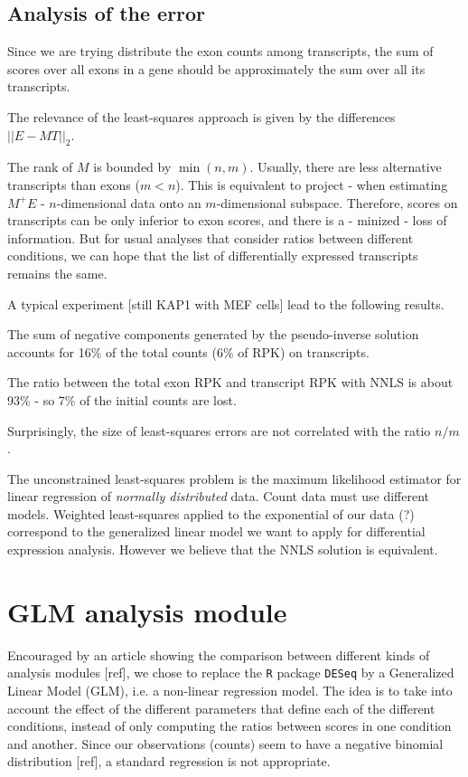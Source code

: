 \documentclass[a4paper,11pt]{article}
\begin{document}
\subsection{Analysis of the error}

Since we are trying distribute the exon counts among transcripts, the sum of scores over all exons in a gene should be approximately the sum over all its transcripts. 

The relevance of the least-squares approach is given by the differences $||E-MT||_2$.
 
The rank of $M$ is bounded by $\min(n,m)$. Usually, there are less alternative transcripts than exons ($m<n$). This is equivalent to project - when estimating $M^{+}E$ - $n$-dimensional data onto an $m$-dimensional subspace. Therefore, scores on transcripts can be only inferior to exon scores, and there is a - minized - loss of information. But for usual analyses that consider ratios between different conditions, we can hope that the list of differentially expressed transcripts remains the same. 

A typical experiment [still KAP1 with MEF cells] lead to the following results.

The sum of negative components generated by the pseudo-inverse solution accounts for 16\% of the total counts (6\% of RPK) on transcripts.

The ratio between the total exon RPK and transcript RPK with NNLS is about 93\% - so 7\% of the initial counts are lost.

Surprisingly, the size of least-squares errors are not correlated with the ratio $n/m$.

The unconstrained least-squares problem is the maximum likelihood estimator for linear regression of \emph{normally distributed} data. Count data must use different models. Weighted least-squares applied to the exponential of our data (?) correspond to the generalized linear model we want to apply for differential expression analysis. However we believe that the NNLS solution is equivalent.

\section{GLM analysis module}

Encouraged by an article showing the comparison between different kinds of analysis modules [ref], we chose to replace the \texttt{R} package \texttt{DESeq} by a Generalized Linear Model (GLM), i.e. a non-linear regression model. The idea is to take into account the effect of the different parameters that define each of the different conditions, instead of only computing the ratios between scores in one condition and another. Since our observations (counts) seem to have a negative binomial distribution [ref], a standard regression is not appropriate.
\end{document}

